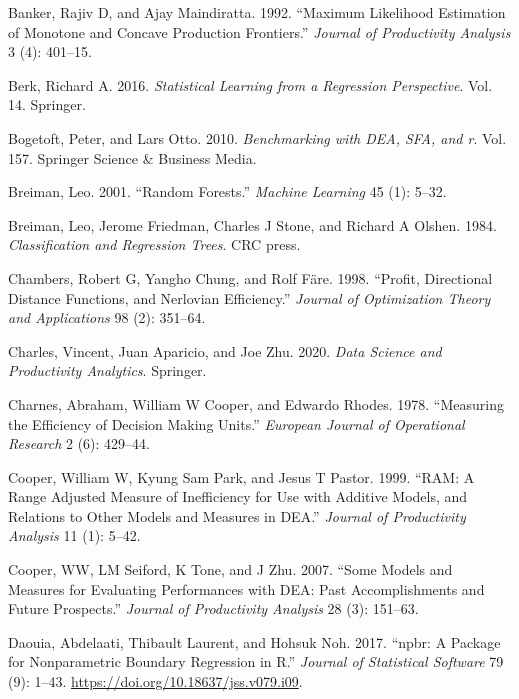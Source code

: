 \begin{CSLReferences}{1}{0}
\leavevmode{}%
Banker, Rajiv D, and Ajay Maindiratta. 1992. {``Maximum Likelihood Estimation of Monotone and Concave Production Frontiers.''} \emph{Journal of Productivity Analysis} 3 (4): 401--15.

\leavevmode{}%
Berk, Richard A. 2016. \emph{Statistical Learning from a Regression Perspective}. Vol. 14. Springer.

\leavevmode{}%
Bogetoft, Peter, and Lars Otto. 2010. \emph{Benchmarking with DEA, SFA, and r}. Vol. 157. Springer Science \& Business Media.

\leavevmode{}%
Breiman, Leo. 2001. {``Random Forests.''} \emph{Machine Learning} 45 (1): 5--32.

\leavevmode{}%
Breiman, Leo, Jerome Friedman, Charles J Stone, and Richard A Olshen. 1984. \emph{Classification and Regression Trees}. CRC press.

\leavevmode{}%
Chambers, Robert G, Yangho Chung, and Rolf Färe. 1998. {``Profit, Directional Distance Functions, and Nerlovian Efficiency.''} \emph{Journal of Optimization Theory and Applications} 98 (2): 351--64.

\leavevmode{}%
Charles, Vincent, Juan Aparicio, and Joe Zhu. 2020. \emph{Data Science and Productivity Analytics}. Springer.

\leavevmode{}%
Charnes, Abraham, William W Cooper, and Edwardo Rhodes. 1978. {``Measuring the Efficiency of Decision Making Units.''} \emph{European Journal of Operational Research} 2 (6): 429--44.

\leavevmode{}%
Cooper, William W, Kyung Sam Park, and Jesus T Pastor. 1999. {``RAM: A Range Adjusted Measure of Inefficiency for Use with Additive Models, and Relations to Other Models and Measures in DEA.''} \emph{Journal of Productivity Analysis} 11 (1): 5--42.

\leavevmode{}%
Cooper, WW, LM Seiford, K Tone, and J Zhu. 2007. {``Some Models and Measures for Evaluating Performances with DEA: Past Accomplishments and Future Prospects.''} \emph{Journal of Productivity Analysis} 28 (3): 151--63.

\leavevmode{}%
Daouia, Abdelaati, Thibault Laurent, and Hohsuk Noh. 2017. {``{npbr}: A Package for Nonparametric Boundary Regression in {R}.''} \emph{Journal of Statistical Software} 79 (9): 1--43. \url{https://doi.org/10.18637/jss.v079.i09}.


\end{CSLReferences}
